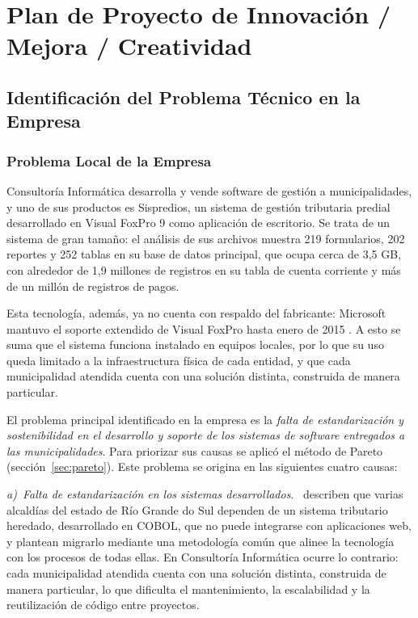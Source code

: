 \documentclass[12pt,a4paper]{report}
\newcommand{\causa}[2]{\par\textit{#1)~#2}.\ }
\begin{document}
\chapter{Plan de Proyecto de Innovación / Mejora / Creatividad}

\section{Identificación del Problema Técnico en la Empresa}

\subsection{Problema Local de la Empresa}
\label{sec:problema-local}

Consultoría Informática desarrolla y vende software de gestión a municipalidades, y uno de sus productos es Sispredios, un sistema de gestión tributaria predial desarrollado en Visual FoxPro 9 como aplicación de escritorio. Se trata de un sistema de gran tamaño: el análisis de sus archivos muestra 219 formularios, 202 reportes y 252 tablas en su base de datos principal, que ocupa cerca de 3,5 GB, con alrededor de 1,9 millones de registros en su tabla de cuenta corriente y más de un millón de registros de pagos. %

Esta tecnología, además, ya no cuenta con respaldo del fabricante: Microsoft mantuvo el soporte extendido de Visual FoxPro hasta enero de 2015 \parencite{taft2007}. A esto se suma que el sistema funciona instalado en equipos locales, por lo que su uso queda limitado a la infraestructura física de cada entidad, y que cada municipalidad atendida cuenta con una solución distinta, construida de manera particular.

El problema principal identificado en la empresa es la \textit{falta de estandarización y sostenibilidad en el desarrollo y soporte de los sistemas de software entregados a las municipalidades}. Para priorizar sus causas se aplicó el método de Pareto (sección~\ref{sec:pareto}). Este problema se origina en las siguientes cuatro causas:

\causa{a}{Falta de estandarización en los sistemas desarrollados}\textcite{debortoli2017} describen que varias alcaldías del estado de Río Grande do Sul dependen de un sistema tributario heredado, desarrollado en COBOL, que no puede integrarse con aplicaciones web, y plantean migrarlo mediante una metodología común que alinee la tecnología con los procesos de todas ellas. En Consultoría Informática ocurre lo contrario: cada municipalidad atendida cuenta con una solución distinta, construida de manera particular, lo que dificulta el mantenimiento, la escalabilidad y la reutilización de código entre proyectos.
\end{document}

